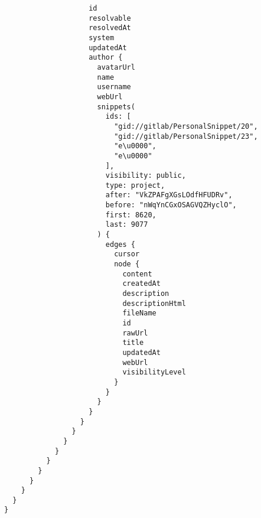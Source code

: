 \begin{lstlisting}
                    id
                    resolvable
                    resolvedAt
                    system
                    updatedAt
                    author {
                      avatarUrl
                      name
                      username
                      webUrl
                      snippets(
                        ids: [
                          "gid://gitlab/PersonalSnippet/20",
                          "gid://gitlab/PersonalSnippet/23",
                          "e\u0000",
                          "e\u0000"
                        ],
                        visibility: public,
                        type: project,
                        after: "VkZPAFgXGsLOdfHFUDRv",
                        before: "nWqYnCGxOSAGVQZHyclO",
                        first: 8620,
                        last: 9077
                      ) {
                        edges {
                          cursor
                          node {
                            content
                            createdAt
                            description
                            descriptionHtml
                            fileName
                            id
                            rawUrl
                            title
                            updatedAt
                            webUrl
                            visibilityLevel
                          }
                        }
                      }
                    }
                  }
                }
              }
            }
          }
        }
      }
    }
  }
}
\end{lstlisting}